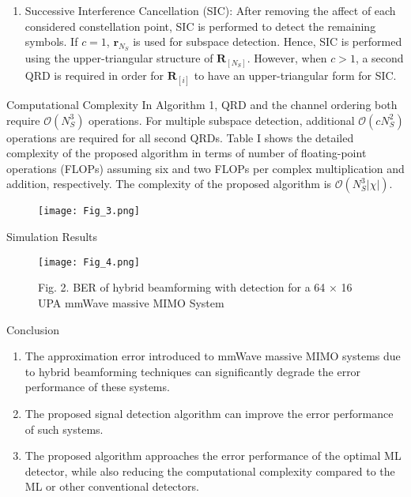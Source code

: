 \documentclass{beamer}
\newcounter{saveenumi}
\newcommand{\conti}{\setcounter{enumi}{\value{saveenumi}}}
\begin{document}
\begin{frame}{}
    \begin{enumerate}
        \conti
        \item Successive Interference Cancellation (SIC): After removing the affect of each considered constellation point, SIC is performed to detect the remaining symbols. If $c=1$, $\boldsymbol{r}_{N_S}$ is used for subspace detection. Hence, SIC is performed using the upper-triangular structure of $\boldsymbol{R}_{[N_S]}$. However, when $c>1$, a second QRD is required in order for $\boldsymbol{R}_{[i]}$ to have an upper-triangular form for SIC. 
    \end{enumerate}
\end{frame}

\begin{frame}{Computational Complexity}
In Algorithm 1, QRD and the channel ordering both require $\mathcal{O}(N_S^3)$ operations. For multiple subspace detection, additional $\mathcal{O}(cN_S^2)$ operations are required for all second QRDs. Table I shows the detailed complexity of the proposed algorithm in terms of number of floating-point operations (FLOPs) assuming six and two FLOPs per complex multiplication and addition, respectively. The complexity of the proposed algorithm is $\mathcal{O}(N_S^3|\chi|)$.
\begin{figure}[htp]
    \centering
    \texttt{[image: Fig\_3.png]}
\end{figure}
\end{frame}

\begin{frame}{Simulation Results}
    \begin{figure}[htp]
    \centering
    \texttt{[image: Fig\_4.png]}
    \caption{Fig. 2. BER of hybrid beamforming with detection for a 64 × 16 UPA mmWave massive MIMO System}
    \label{Fig. 2.}
\end{figure}
\end{frame}

\begin{frame}{Conclusion}
\begin{enumerate}
    \item The approximation error introduced to mmWave massive
    MIMO systems due to hybrid beamforming techniques can
    significantly degrade the error performance of these systems.
    \item The proposed  signal detection algorithm  can improve the error performance of such systems.
    \item The proposed algorithm approaches the error performance of
    the optimal ML detector, while also reducing the computational complexity compared to the ML or other conventional detectors.
\end{enumerate}
\end{frame}
\end{document}
